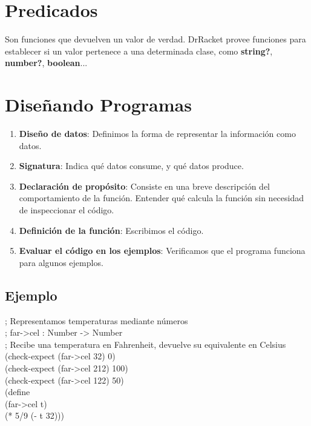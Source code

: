 \documentclass[11pt,a4paper]{article}
\begin{document}
\section{Predicados}
Son funciones que devuelven un valor de verdad. DrRacket provee funciones para establecer si un valor pertenece a una
determinada clase, como \textbf{string?}, \textbf{number?}, \textbf{boolean}...

\newpage
\section{Dise\~nando Programas}
\begin{enumerate}
\item \textbf{Diseño de datos}: Definimos la forma de representar la información como datos.
\item \textbf{Signatura}: Indica qué datos consume, y qué datos produce.
\item \textbf{Declaración de propósito}: Consiste en una breve descripción del comportamiento de la función. Entender qué calcula la función sin necesidad de inspeccionar el código.
\item \textbf{Definición de la función}: Escribimos el código.
\item \textbf{Evaluar el código en los ejemplos}: Verificamos que el programa funciona para algunos ejemplos.
\end{enumerate}
\subsection{Ejemplo}
\begin{siderules}
; Representamos temperaturas mediante números\\
; far->cel : Number -> Number\\
; Recibe una temperatura en Fahrenheit, devuelve su equivalente en Celsius\\
(check-expect (far->cel 32) 0)\\
(check-expect (far->cel 212) 100)\\
(check-expect (far->cel 122) 50)\\
(define\\
\indent \indent (far->cel t)\\
\indent \indent (* 5/9 (- t 32)))
\end{siderules}
\end{document}
